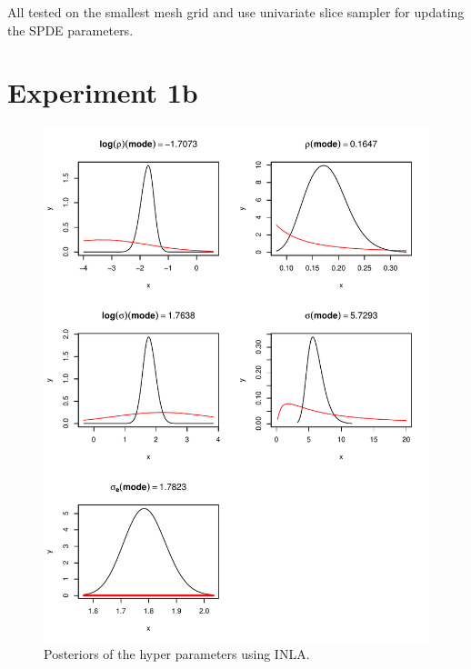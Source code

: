 \documentclass[a4paper,12pt]{article}
\begin{document}
All tested on the smallest mesh grid and use univariate slice sampler for updating the SPDE parameters.





\section{Experiment 1b}


\begin{figure}[htbp]
 \begin{center}
 \includegraphics[scale=0.8]{fig/1bsMesh_hyperpar.pdf}
 \end{center}
 \caption[Posterior hyper parameters]{Posteriors of the hyper parameters using INLA.}
 \label{fig:5}
 \end{figure}
\end{document}
